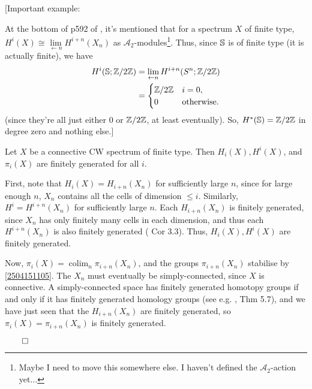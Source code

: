 \documentclass{MetricNotes2023}
\def\bb{\ensuremath\mathbb}
\def\subq{\ensuremath\subseteq}
\def\inte{\ensuremath\mathbb{Z}}
\def\A{\ensuremath{\mathscr{A}_2}}
\DeclareMathOperator{\colim}{colim}
\def\done{\begin{flushright}\vspace{-4.35ex}\(\qed\)\end{flushright}}
\begin{document}
[Important example:

At the bottom of p592 of \autocite{hatcher5}, it's mentioned that for a spectrum \(X\) of finite type, \(H^i(X)\cong \lim\limits_{\leftarrow n}H^{i+n}(X_n)\) as \(\mathscr{A}_2\)-modules\footnote{Maybe I need to move this somewhere else. I haven't  defined the \(\A\)-action yet...}. Thus, since \(\bb{S}\) is of finite type (it is actually finite), we have
\begin{align*}
H^i(\bb{S}; \inte/2\inte)&=\lim\limits_{\leftarrow n}H^{i+n}(S^n; \inte/2\inte)\\
&=\begin{cases}
\inte/2\inte & i = 0,\\
0 & \text{otherwise.}
\end{cases}
\end{align*}
(since they're all just either \(0\) or \(\inte/2\inte\), at least eventually). So, \(H^*(\bb{S})=\inte/2\inte\) in degree zero and nothing else.]

\begin{lemma}\label{2504141556}
Let \(X\) be a connective CW spectrum of finite type. Then \(H_i(X), H^i(X)\), and \(\pi_i(X)\) are finitely generated for all \(i\). 
\end{lemma}

\begin{ourproof}
First, note that \(H_i(X)=H_{i+n}(X_n)\) for sufficiently large \(n\), since for large enough \(n\), \(X_n\) contains all the cells of dimension \(\leq i\). Similarly, \(H^i=H^{i+n}(X_n)\) for sufficiently large \(n\). Each \(H_{i+n}(X_n)\) is finitely generated, since \(X_n\) has only finitely many cells in each dimension, and thus each \(H^{i+n}(X_n)\) is also finitely generated (\autocite{hatcher} Cor 3.3). Thus, \(H_i(X), H^i(X)\) are finitely generated. 

Now, \(\pi_i(X)=\colim_n \pi_{i+n}(X_n)\), and the groups \(\pi_{i+n}(X_n)\) stabilise by \ref{2504151105}. The \(X_n\) must eventually be simply-connected, since \(X\) is connective. %
A simply-connected space has finitely generated homotopy groups if and only if it has finitely generated homology groups (see e.g. \autocite{hatcher}, Thm 5.7), and we have just seen that the \(H_{i+n}(X_n)\) are finitely generated, so \(\pi_i(X)=\pi_{i+n}(X_n)\) is finitely generated. \done
\end{ourproof}
\end{document}
